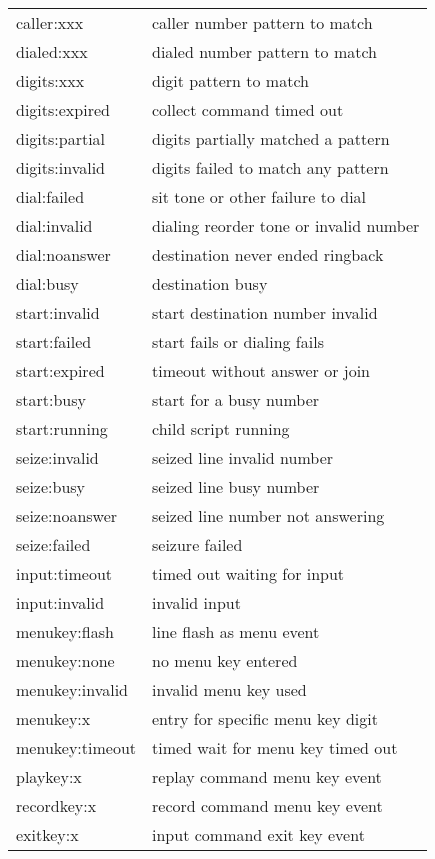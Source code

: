\documentclass[a4paper,12pt]{article}
\begin{document}
\begin{supertabular}{ll}
caller:xxx			& caller number pattern to match \\
dialed:xxx			& dialed number pattern to match \\
digits:xxx			& digit pattern to match \\
digits:expired			& collect command timed out \\
digits:partial			& digits partially matched a pattern \\
digits:invalid			& digits failed to match any pattern \\
dial:failed			& sit tone or other failure to dial \\
dial:invalid			& dialing reorder tone or invalid number \\
dial:noanswer			& destination never ended ringback \\
dial:busy			& destination busy \\
start:invalid			& start destination number invalid \\
start:failed			& start fails or dialing fails \\
start:expired			& timeout without answer or join \\
start:busy			& start for a busy number \\
start:running			& child script running \\
seize:invalid			& seized line invalid number \\
seize:busy			& seized line busy number \\
seize:noanswer			& seized line number not answering \\
seize:failed			& seizure failed \\
input:timeout			& timed out waiting for input \\
input:invalid			& invalid input \\
menukey:flash			& line flash as menu event \\
menukey:none			& no menu key entered \\
menukey:invalid			& invalid menu key used \\
menukey:x			& entry for specific menu key digit \\
menukey:timeout			& timed wait for menu key timed out \\
playkey:x			& replay command menu key event \\
recordkey:x			& record command menu key event \\
exitkey:x			& input command exit key event \\

\end{supertabular}
\end{document}
